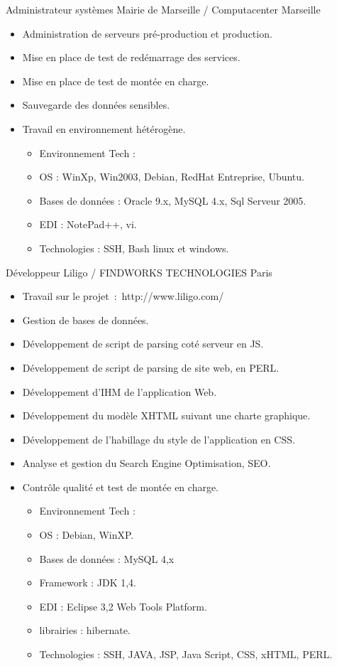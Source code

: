 \documentclass[10pt,a4paper,sans]{moderncv}
\begin{document}
 {Administrateur systèmes} {Mairie de Marseille / Computacenter}
{Marseille}{} {
    \begin{itemize}%
        \item Administration de serveurs pré-production et production.
        \item Mise en place de test de redémarrage des services.
        \item Mise en place de test de montée en charge.
        \item Sauvegarde des données sensibles.
        \item Travail en environnement hétérogène.
            \begin{itemize}%
                \item Environnement Tech :
                \item OS : WinXp, Win2003, Debian, RedHat Entreprise, Ubuntu.
                \item Bases de données : Oracle 9.x, MySQL 4.x, Sql Serveur 2005.
                \item EDI : NotePad++, vi.
                \item Technologies : SSH, Bash linux et windows.
            \end{itemize}
\end{itemize}}

 {Développeur} {Liligo / FINDWORKS TECHNOLOGIES}
{Paris}{} {
    \begin{itemize}%
        \item Travail sur le projet : http://www.liligo.com/
        \item Gestion de bases de données.
        \item Développement de script de parsing coté serveur en JS.
        \item Développement de script de parsing de site web, en PERL.
        \item Développement d'IHM de l'application Web.
        \item Développement du modèle XHTML suivant une charte graphique.
        \item Développement de l’habillage du style de l'application en CSS.
        \item Analyse et gestion du Search Engine Optimisation, SEO.
        \item Contrôle qualité et test de montée en charge.
            \begin{itemize}%
                \item Environnement Tech :
                \item OS : Debian, WinXP.
                \item Bases de données : MySQL 4,x
                \item Framework : JDK 1,4.
                \item EDI : Eclipse 3,2 Web Tools Platform.
                \item librairies : hibernate.
                \item Technologies : SSH, JAVA, JSP, Java Script, CSS, xHTML, PERL.
            \end{itemize}
\end{itemize}}

\clearpage
\end{document}
